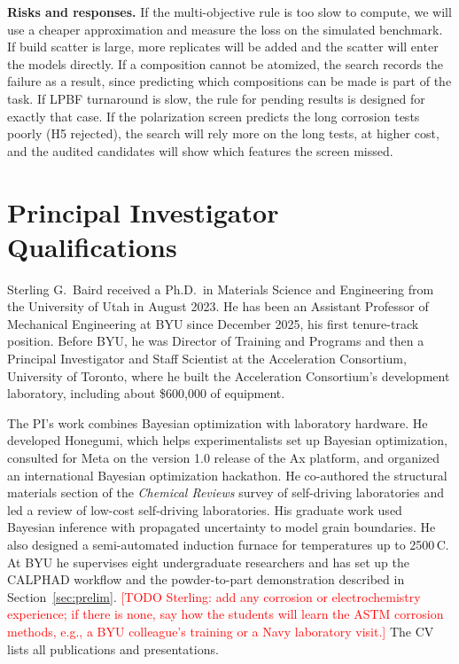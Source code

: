 \documentclass[12pt,letterpaper]{article}
\newcommand{\todo}[1]{\textcolor{red}{[TODO Sterling: #1]}}
\begin{document}
\textbf{Risks and responses.} If the multi-objective rule is too slow to
compute, we will use a cheaper approximation and measure the loss on the
simulated benchmark. If build scatter is large, more replicates will be
added and the scatter will enter the models directly. If a composition cannot
be atomized, the search records the failure as a result, since predicting
which compositions can be made is part of the task. If LPBF turnaround is
slow, the rule for pending results is designed for exactly that case. If the
polarization screen predicts the long corrosion tests poorly (H5 rejected),
the search will rely more on the long tests, at higher cost, and the audited
candidates will show which features the screen missed.

\section{Principal Investigator Qualifications}
\label{sec:quals}

Sterling G.\ Baird received a Ph.D.\ in Materials Science and Engineering
from the University of Utah in August 2023. He has been an Assistant
Professor of Mechanical Engineering at BYU since December 2025, his first
tenure-track position. Before BYU, he was Director of Training and Programs
and then a Principal Investigator and Staff Scientist at the Acceleration
Consortium, University of Toronto, where he built the Acceleration
Consortium's development laboratory, including about \$600,000 of equipment.

The PI's work combines Bayesian optimization with laboratory hardware. He
developed Honegumi, which helps experimentalists set up Bayesian
optimization, consulted for Meta on the version 1.0 release of the Ax
platform, and organized an international Bayesian optimization hackathon. He
co-authored the structural materials section of the \emph{Chemical Reviews}
survey of self-driving laboratories and led a review of low-cost
self-driving laboratories. His graduate work used Bayesian inference with
propagated uncertainty to model grain boundaries. He also designed a
semi-automated induction furnace for temperatures up to 2500\,\textdegree{}C.
At BYU he supervises eight undergraduate researchers and has set up the
CALPHAD workflow and the powder-to-part demonstration described in
Section~\ref{sec:prelim}. \todo{add any corrosion or electrochemistry
experience; if there is none, say how the students will learn the ASTM
corrosion methods, e.g., a BYU colleague's training or a Navy laboratory
visit.} The CV lists all publications and presentations.
\end{document}
